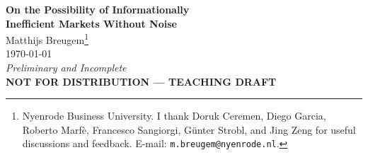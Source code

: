 \documentclass[12pt,letterpaper]{article}
\title{}
\author{}
\date{}
\theoremstyle{definition}
\theoremstyle{remark}
\newcommand{\1}{\mathbf{1}}
\begin{document}
\thispagestyle{empty}
\vspace*{1.8cm}
\begin{center}
{\LARGE\bfseries On the Possibility of Informationally}\\[6pt]
{\LARGE\bfseries Inefficient Markets Without Noise}\\[28pt]
{\large Matthijs Breugem\footnote{Nyenrode Business University.
I thank Doruk Ceremen, Diego Garcia, Roberto Marf\`e,
Francesco Sangiorgi, G\"unter Strobl, and Jing Zeng
for useful discussions and feedback.
E-mail: \texttt{m.breugem@nyenrode.nl}.}}\\[10pt]
{\normalsize \today}\\[10pt]
{\normalsize\itshape Preliminary and Incomplete}\\[8pt]
{\large\bfseries\color{red} NOT FOR DISTRIBUTION --- TEACHING DRAFT}
\end{center}

\vspace{10pt}

\begin{center}
\begin{minipage}{0.85\textwidth}
\begin{abstract}
\noindent
Noise traders can be dispensed with entirely. Partial revelation of
information through prices arises under any non-exponential
expected-utility preference---including CRRA---without noise traders,
random endowments, supply shocks, hedging motives, or behavioural
biases. The model contains zero exogenous noise.

The mechanism is a mismatch between the space in which market clearing
aggregates signals and the Bayesian sufficient statistic. CARA demand
is linear in log-odds, so prices aggregate in log-odds space and reveal
the statistic exactly. Every other preference aggregates differently;
the resulting Jensen gap makes revelation partial. I prove CARA is
the unique fully revealing preference class, characterise the
rational-expectations equilibrium via a contour-integration fixed point,
and verify that partial revelation survives learning from prices. The
Grossman--Stiglitz paradox is resolved: information acquisition has
positive value within the rational class.
\\[16pt]
\noindent\textbf{Keywords:} rational expectations, partial revelation,
noise traders, CRRA, Grossman--Stiglitz paradox, aggregation space.\\[4pt]
\noindent\textbf{JEL codes:} D82, D83, G14.
\end{abstract}
\end{minipage}
\end{center}
\end{document}
